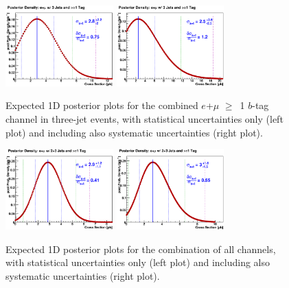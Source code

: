 \vspace{0.1in}
\begin{figure}[!h!tbp]
\includegraphics[width=0.37\textwidth]
{figures/posterior/nosys/expected_limit_TBTQ_LeptonsCombined_3Jet_TagsCombined}
\includegraphics[width=0.37\textwidth]
{figures/posterior/sys/expected_limit_TBTQ_LeptonsCombined_3Jet_TagsCombined}
\vspace{-0.1in}
\caption[exppost1d3j]{Expected 1D posterior plots for the combined
$e$+$\mu$ $\geq$~1 $b$-tag channel in three-jet events, with
statistical uncertainties only (left plot) and including also
systematic uncertainties (right plot).}
\label{exp-post-1d-3j}
\end{figure}

\vspace{0.1in}
\begin{figure}[!h!tbp]
\includegraphics[width=0.37\textwidth]
{figures/posterior/nosys/expected_limit_TBTQ_LeptonsCombined_JetsCombined_TagsCombined}
\includegraphics[width=0.37\textwidth]
{figures/posterior/sys/expected_limit_TBTQ_LeptonsCombined_JetsCombined_TagsCombined}
\vspace{-0.1in}
\caption[exppost1dallj]{Expected 1D posterior plots for the
combination of all channels, with statistical uncertainties only (left
plot) and including also systematic uncertainties (right plot).}
\label{exp-post-1d-allj}
\end{figure}

